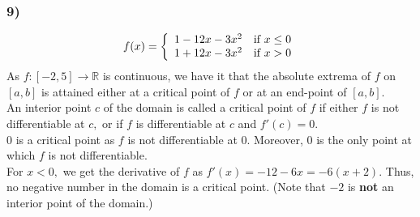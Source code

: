 \documentclass[handout]{beamer}
\begin{document}
\begin{frame}
    \frametitle{9)}
    \[f(x) = \left\{\begin{array}{l r}
		1 - 12x - 3x^2  & \text{if } x \le 0\\
		1 + 12x - 3x^2	& \text{if } x > 0
	\end{array}
	\right.\]
	As $f:[-2, 5] \to \mathbb{R}$ is continuous, we have it that the absolute extrema of $f$ on $[a, b]$ is attained either at a critical point of $f$ or at an end-point of $[a, b].$\\
	An interior point $c$ of the domain is called a critical point of $f$ if either $f$ is not differentiable at $c,$ or if $f$ is differentiable at $c$ and $f'(c) = 0.$\\
	$0$ is a critical point as $f$ is not differentiable at $0.$ Moreover, $0$ is the only point at which $f$ is not differentiable.\\
	For $x < 0,$ we get the derivative of $f$ as $f'(x) = -12 - 6x = -6(x + 2).$ Thus, no negative number in the domain is a critical point. (Note that $-2$ is \textbf{not} an interior point of the domain.)
\end{frame}
\end{document}
